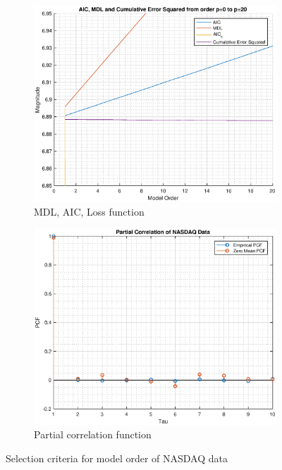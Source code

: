 \begin{figure}[h!]
\centering
\begin{subfigure}{0.32\textwidth}
\centering
\includegraphics[width = \textwidth]{nasdaq_mdl}
\caption{MDL, AIC, Loss function}
\label{fig:nasdaq_mdl}
\end{subfigure}
\begin{subfigure}{0.32\textwidth}
\centering
\includegraphics[width = \textwidth]{nasdaq_pcf}
\caption{Partial correlation function}
\label{fig:nasdaq_pcf}
\end{subfigure}
\caption{Selection criteria for model order of NASDAQ data}
\label{fig:cramer_ar1}
\end{figure}



